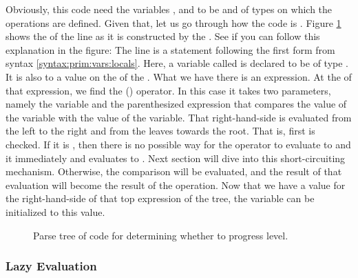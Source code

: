 Obviously, this code need the variables ,  and  to be  and of types on which the operations are defined. Given that, let us go through how the code is . Figure \ref{fig:prim:bool:csharp:parsetree} shows the  of the line as it is constructed by the . See if you can follow this explanation in the figure: The line is a statement following the first  form from syntax \ref{syntax:prim:vars:locals}. Here, a variable called  is declared to be of type . It is also  to a value on the  of the . What we have there is an expression. At the  of that expression, we find the \keywordname{\&\&} () operator. In this case it takes two parameters, namely the  variable and the parenthesized expression that compares the value of the  variable with the value of the  variable. That right-hand-side is evaluated from the left to the right and from the leaves towards the root. That is, first  is checked. If it is , then there is no possible way for the \keywordname{\&\&} operator to evaluate to  and it immediately  and evaluates to . Next section will dive into this short-circuiting mechanism. Otherwise, the comparison will be evaluated, and the result of that evaluation will become the result of the \keywordname{\&\&} operation. Now that we have a value for the right-hand-side of that top expression of the tree, the  variable can be initialized to this value.

\begin{figure}[tbp]
  
  \caption{Parse tree of code for determining whether to progress level.}
  \label{fig:prim:bool:csharp:parsetree}
\end{figure}

\subsubsection{Lazy Evaluation}


